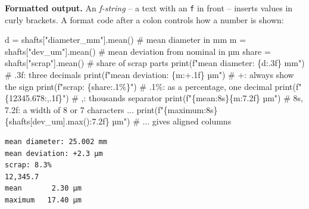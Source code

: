 \documentclass[
  letterpaper,
  DIV=11,
  numbers=noendperiod]{scrreprt}
\newenvironment{Shaded}{\begin{snugshade}}{\end{snugshade}}
\newcommand{\BuiltInTok}[1]{\textcolor[rgb]{0.00,0.23,0.31}{#1}}
\newcommand{\CommentTok}[1]{\textcolor[rgb]{0.37,0.37,0.37}{#1}}
\newcommand{\FloatTok}[1]{\textcolor[rgb]{0.68,0.00,0.00}{#1}}
\newcommand{\NormalTok}[1]{\textcolor[rgb]{0.00,0.23,0.31}{#1}}
\newcommand{\OperatorTok}[1]{\textcolor[rgb]{0.37,0.37,0.37}{#1}}
\newcommand{\SpecialCharTok}[1]{\textcolor[rgb]{0.37,0.37,0.37}{#1}}
\newcommand{\SpecialStringTok}[1]{\textcolor[rgb]{0.13,0.47,0.30}{#1}}
\newcommand{\StringTok}[1]{\textcolor[rgb]{0.13,0.47,0.30}{#1}}
\begin{document}
\textbf{Formatted output.} An \emph{f-string} -- a text with an
\texttt{f} in front -- inserts values in curly brackets. A format code
after a colon controls how a number is shown:

\begin{Shaded}
\begin{Highlighting}[]
\NormalTok{d }\OperatorTok{=}\NormalTok{ shafts[}\StringTok{"diameter\_mm"}\NormalTok{].mean()             }\CommentTok{\# mean diameter in mm}
\NormalTok{m }\OperatorTok{=}\NormalTok{ shafts[}\StringTok{"dev\_um"}\NormalTok{].mean()                  }\CommentTok{\# mean deviation from nominal in µm}
\NormalTok{share }\OperatorTok{=}\NormalTok{ shafts[}\StringTok{"scrap"}\NormalTok{].mean()               }\CommentTok{\# share of scrap parts}
\BuiltInTok{print}\NormalTok{(}\SpecialStringTok{f"mean diameter: }\SpecialCharTok{\{}\NormalTok{d}\SpecialCharTok{:.3f\}}\SpecialStringTok{ mm"}\NormalTok{)          }\CommentTok{\# .3f: three decimals}
\BuiltInTok{print}\NormalTok{(}\SpecialStringTok{f"mean deviation: }\SpecialCharTok{\{}\NormalTok{m}\SpecialCharTok{:+.1f\}}\SpecialStringTok{ µm"}\NormalTok{)        }\CommentTok{\# +: always show the sign}
\BuiltInTok{print}\NormalTok{(}\SpecialStringTok{f"scrap: }\SpecialCharTok{\{}\NormalTok{share}\SpecialCharTok{:.1\%\}}\SpecialStringTok{"}\NormalTok{)                 }\CommentTok{\# .1\%: as a percentage, one decimal}
\BuiltInTok{print}\NormalTok{(}\SpecialStringTok{f"}\SpecialCharTok{\{}\FloatTok{12345.678}\SpecialCharTok{:,.1f\}}\SpecialStringTok{"}\NormalTok{)                   }\CommentTok{\# ,: thousands separator}
\BuiltInTok{print}\NormalTok{(}\SpecialStringTok{f"}\SpecialCharTok{\{}\StringTok{\textquotesingle{}mean\textquotesingle{}}\SpecialCharTok{:8s\}\{}\NormalTok{m}\SpecialCharTok{:7.2f\}}\SpecialStringTok{ µm"}\NormalTok{)             }\CommentTok{\# 8s, 7.2f: a width of 8 or 7 characters ...}
\BuiltInTok{print}\NormalTok{(}\SpecialStringTok{f"}\SpecialCharTok{\{}\StringTok{\textquotesingle{}maximum\textquotesingle{}}\SpecialCharTok{:8s\}\{}\NormalTok{shafts[}\StringTok{\textquotesingle{}dev\_um\textquotesingle{}}\NormalTok{]}\SpecialCharTok{.}\BuiltInTok{max}\NormalTok{()}\SpecialCharTok{:7.2f\}}\SpecialStringTok{ µm"}\NormalTok{)   }\CommentTok{\# ... gives aligned columns}
\end{Highlighting}
\end{Shaded}

\begin{verbatim}
mean diameter: 25.002 mm
mean deviation: +2.3 µm
scrap: 8.3%
12,345.7
mean       2.30 µm
maximum   17.40 µm
\end{verbatim}
\end{document}
